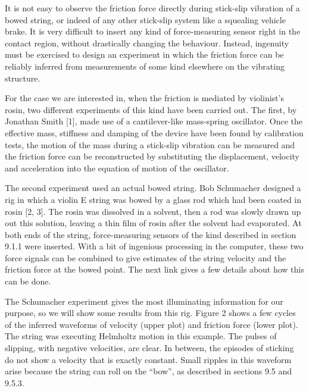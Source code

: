   It is not easy to observe the friction force directly during stick-slip 
  vibration of a bowed string, or indeed of any other stick-slip system like a 
  squealing vehicle brake. It is very difficult to insert any kind of 
  force-measuring sensor right in the contact region, without drastically 
  changing the behaviour. Instead, ingenuity must be exercised to design an 
  experiment in which the friction force can be reliably inferred from 
  measurements of some kind elsewhere on the vibrating structure. 

  For the case we are interested in, when the friction is mediated by 
  violinist’s rosin, two different experiments of this kind have been carried 
  out. The first, by Jonathan Smith [1], made use of a cantilever-like 
  mass-spring oscillator. Once the effective mass, stiffness and damping of the 
  device have been found by calibration tests, the motion of the mass during a 
  stick-slip vibration can be measured and the friction force can be 
  reconstructed by substituting the displacement, velocity and acceleration 
  into the equation of motion of the oscillator. 

  The second experiment used an actual bowed string. Bob Schumacher designed a 
  rig in which a violin E string was bowed by a glass rod which had been coated 
  in rosin [2, 3]. The rosin was dissolved in a solvent, then a rod was slowly 
  drawn up out this solution, leaving a thin film of rosin after the solvent 
  had evaporated. At both ends of the string, force-measuring sensors of the 
  kind described in section 9.1.1 were inserted. With a bit of ingenious 
  processing in the computer, these two force signals can be combined to give 
  estimates of the string velocity and the friction force at the bowed point. 
  The next link gives a few details about how this can be done. 

  The Schumacher experiment gives the most illuminating information for our 
  purpose, so we will show some results from this rig. Figure 2 shows a few 
  cycles of the inferred waveforms of velocity (upper plot) and friction force 
  (lower plot). The string was executing Helmholtz motion in this example. The 
  pulses of slipping, with negative velocities, are clear. In between, the 
  episodes of sticking do not show a velocity that is exactly constant. Small 
  ripples in this waveform arise because the string can roll on the “bow”, as 
  described in sections 9.5 and 9.5.3. 

